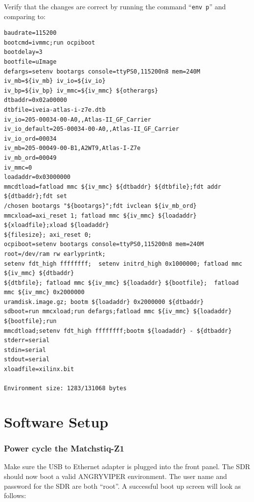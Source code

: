 \begin{flushleft}
Verify that the changes are correct by running the command ``\texttt{env p}'' and comparing to:
\end{flushleft}
\begin{verbatim}
baudrate=115200
bootcmd=ivmmc;run ocpiboot
bootdelay=3
bootfile=uImage
defargs=setenv bootargs console=ttyPS0,115200n8 mem=240M iv_mb=${iv_mb} iv_io=${iv_io}
iv_bp=${iv_bp} iv_mmc=${iv_mmc} ${otherargs}
dtbaddr=0x02a00000
dtbfile=iveia-atlas-i-z7e.dtb
iv_io=205-00034-00-A0,,Atlas-II_GF_Carrier
iv_io_default=205-00034-00-A0,,Atlas-II_GF_Carrier
iv_io_ord=00034
iv_mb=205-00049-00-B1,A2WT9,Atlas-I-Z7e
iv_mb_ord=00049
iv_mmc=0
loadaddr=0x03000000
mmcdtload=fatload mmc ${iv_mmc} ${dtbaddr} ${dtbfile};fdt addr ${dtbaddr};fdt set
/chosen bootargs "${bootargs}";fdt ivclean ${iv_mb_ord}
mmcxload=axi_reset 1; fatload mmc ${iv_mmc} ${loadaddr} ${xloadfile};xload ${loadaddr}
${filesize}; axi_reset 0;
ocpiboot=setenv bootargs console=ttyPS0,115200n8 mem=240M root=/dev/ram rw earlyprintk;
setenv fdt_high ffffffff;  setenv initrd_high 0x1000000; fatload mmc ${iv_mmc} ${dtbaddr}
${dtbfile}; fatload mmc ${iv_mmc} ${loadaddr} ${bootfile};  fatload mmc ${iv_mmc} 0x2000000
uramdisk.image.gz; bootm ${loadaddr} 0x2000000 ${dtbaddr}
sdboot=run mmcxload;run defargs;fatload mmc ${iv_mmc} ${loadaddr} ${bootfile};run
mmcdtload;setenv fdt_high ffffffff;bootm ${loadaddr} - ${dtbaddr}
stderr=serial
stdin=serial
stdout=serial
xloadfile=xilinx.bit

Environment size: 1283/131068 bytes
\end{verbatim}

\section{Software Setup}

%
\subsubsection*{Power cycle the Matchstiq-Z1}
Make sure the USB to Ethernet adapter is plugged into the front panel. The SDR should now boot a valid ANGRYVIPER environment.  The user name and password for the SDR are both ``root''.  A successful boot up screen will look as follows:

